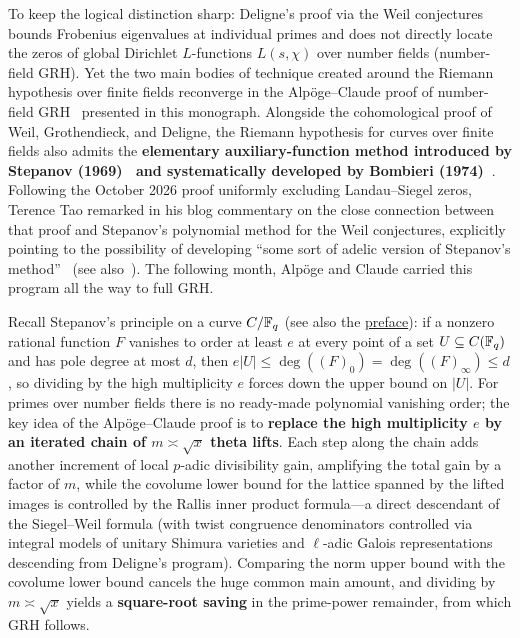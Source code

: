 To keep the logical distinction sharp: Deligne's proof via the Weil conjectures bounds Frobenius eigenvalues at individual primes and does not directly locate the zeros of global Dirichlet $L$-functions $L(s,\chi)$ over number fields (number-field GRH). Yet the two main bodies of technique created around the Riemann hypothesis over finite fields reconverge in the Alpöge--Claude proof of number-field GRH~\cite{Alpoge2026} presented in this monograph. Alongside the cohomological proof of Weil, Grothendieck, and Deligne, the Riemann hypothesis for curves over finite fields also admits the \textbf{elementary auxiliary-function method introduced by Stepanov (1969)~\cite{Stepanov1969} and systematically developed by Bombieri (1974)~\cite{Bombieri1974}}. Following the October 2026 proof uniformly excluding Landau--Siegel zeros, Terence Tao remarked in his blog commentary on the close connection between that proof and Stepanov's polynomial method for the Weil conjectures, explicitly pointing to the possibility of developing ``some sort of adelic version of Stepanov's method''~\cite{Tao2026SiegelComment} (see also~\cite{SIYZ2026}). The following month, Alpöge and Claude carried this program all the way to full GRH.

Recall Stepanov's principle on a curve $C/\mathbb{F}_q$ (see also the \hyperref[par:stepanov-method]{preface}): if a nonzero rational function $F$ vanishes to order at least $e$ at every point of a set $U\subseteq C(\mathbb{F}_q)$ and has pole degree at most $d$, then $e|U|\le\deg((F)_0)=\deg((F)_\infty)\le d$, so dividing by the high multiplicity $e$ forces down the upper bound on $|U|$. For primes over number fields there is no ready-made polynomial vanishing order; the key idea of the Alpöge--Claude proof is to \textbf{replace the high multiplicity $e$ by an iterated chain of $m\asymp\sqrt{x}$ theta lifts}. Each step along the chain adds another increment of local $p$-adic divisibility gain, amplifying the total gain by a factor of $m$, while the covolume lower bound for the lattice spanned by the lifted images is controlled by the Rallis inner product formula---a direct descendant of the Siegel--Weil formula (with twist congruence denominators controlled via integral models of unitary Shimura varieties and $\ell$-adic Galois representations descending from Deligne's program). Comparing the norm upper bound with the covolume lower bound cancels the huge common main amount, and dividing by $m\asymp\sqrt{x}$ yields a \textbf{square-root saving} in the prime-power remainder, from which GRH follows.

